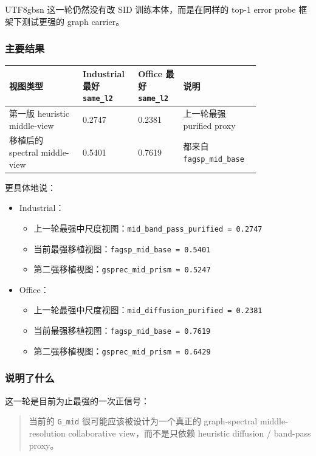 \documentclass[11pt]{article}
\begin{document}
\begin{CJK*}{UTF8}{gbsn}
这一轮仍然没有改 SID 训练本体，而是在同样的 top-1 error probe 框架下测试更强的 graph carrier。

\subsubsection*{主要结果}

\begin{longtable}{p{0.26\linewidth}p{0.16\linewidth}p{0.16\linewidth}p{0.24\linewidth}}
\toprule
视图类型 & Industrial 最好 \texttt{same\_l2} & Office 最好 \texttt{same\_l2} & 说明 \\
\midrule
第一版 heuristic middle-view & 0.2747 & 0.2381 & 上一轮最强 purified proxy \\
移植后的 spectral middle-view & 0.5401 & 0.7619 & 都来自 \texttt{fagsp\_mid\_base} \\
\bottomrule
\end{longtable}

更具体地说：

\begin{itemize}
  \item Industrial：
  \begin{itemize}
    \item 上一轮最强中尺度视图：\texttt{mid\_band\_pass\_purified = 0.2747}
    \item 当前最强移植视图：\texttt{fagsp\_mid\_base = 0.5401}
    \item 第二强移植视图：\texttt{gsprec\_mid\_prism = 0.5247}
  \end{itemize}
  \item Office：
  \begin{itemize}
    \item 上一轮最强中尺度视图：\texttt{mid\_diffusion\_purified = 0.2381}
    \item 当前最强移植视图：\texttt{fagsp\_mid\_base = 0.7619}
    \item 第二强移植视图：\texttt{gsprec\_mid\_prism = 0.6429}
  \end{itemize}
\end{itemize}

\subsubsection*{说明了什么}

这一轮是目前为止最强的一次正信号：

\begin{quote}
当前的 \texttt{G\_mid} 很可能应该被设计为一个真正的 graph-spectral middle-resolution collaborative view，而不是只依赖 heuristic diffusion / band-pass proxy。
\end{quote}


\end{CJK*}
\end{document}

